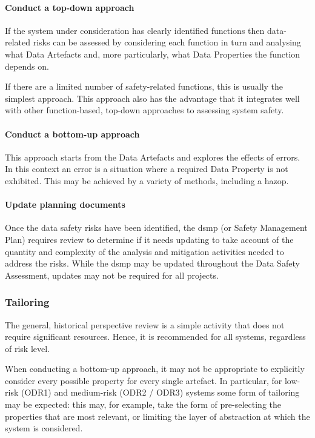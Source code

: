 \paragraph{Conduct a top-down approach}
If the system under consideration has clearly identified functions then data-related risks can be assessed by considering each function in turn and analysing what Data Artefacts and, more particularly, what Data Properties the function depends on.

If there are a limited number of safety-related functions, this is usually the simplest approach. This approach also has the advantage that it integrates well with other function-based, top-down approaches to assessing system safety. 

\paragraph{Conduct a bottom-up approach}
This approach starts from the Data Artefacts and explores the effects of \glspl{error}. In this context an error is a situation where a required Data Property is not exhibited. This may be achieved by a variety of methods, including a \gls{hazop}.

\paragraph{Update planning documents}
Once the data safety risks have been identified, the \gls{dsmp} (or Safety Management Plan)
requires review to determine if it needs
updating to take account of the quantity and complexity of the analysis and mitigation activities needed to address the risks. While the \gls{dsmp} may be updated throughout the Data Safety Assessment, updates may not be required for all projects.

\subsubsection{Tailoring}
The general, historical perspective review is a simple activity that does not require significant resources. Hence, it is recommended for all systems, regardless of risk level.

When conducting a bottom-up approach, it may not be appropriate to explicitly consider every possible property for every single artefact. In particular, for low-risk (ODR1) and medium-risk (ODR2 / ODR3) systems some form of tailoring may be expected: this may, for example, take the form of pre-selecting the properties that are most relevant, or limiting the layer of abstraction at which the system is considered.

